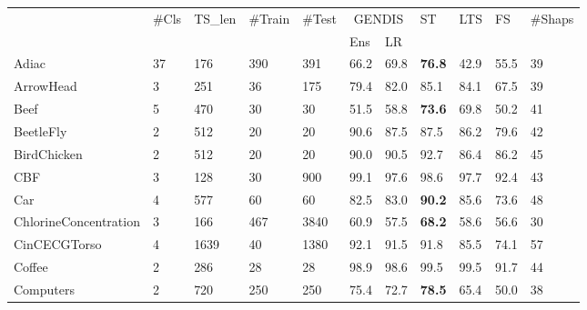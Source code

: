 \documentclass[runningheads]{llncs}
\begin{document}
\begin{table}[t]
	\centering
	\scriptsize
	\begin{tabular}{>{\tiny}lllll|lllll|l}
		\toprule
		\multirow{2}{*}{\scriptsize Dataset} & \multirow{2}{*}{\#Cls} & \multirow{2}{*}{TS\_len} & \multirow{2}{*}{\#Train} & \multirow{2}{*}{\#Test} & \multicolumn{2}{c}{GENDIS} & \multirow{2}{*}{ST} & \multirow{2}{*}{LTS} & \multirow{2}{*}{FS} & \multirow{2}{*}{\#Shaps} \\
		& & & & & Ens & LR & & & & \\ \midrule
		Adiac                        & 37        & 176       & 390     & 391    & 66.2  & 69.8  & \textbf{76.8} & 42.9          & 55.5 & 39          \\
		ArrowHead                    & 3         & 251       & 36      & 175    & 79.4  & 82.0  & 85.1          & 84.1          & 67.5 & 39          \\
		Beef                         & 5         & 470       & 30      & 30     & 51.5  & 58.8  & \textbf{73.6} & 69.8          & 50.2 & 41          \\
		BeetleFly                    & 2         & 512       & 20      & 20     & 90.6  & 87.5  & 87.5          & 86.2          & 79.6 & 42          \\
		BirdChicken                  & 2         & 512       & 20      & 20     & 90.0  & 90.5  & 92.7          & 86.4          & 86.2 & 45          \\
		CBF                          & 3         & 128       & 30      & 900    & 99.1  & 97.6  & 98.6          & 97.7          & 92.4 & 43          \\
		Car                          & 4         & 577       & 60      & 60     & 82.5  & 83.0  & \textbf{90.2} & 85.6          & 73.6 & 48          \\
		ChlorineConcentration        & 3         & 166       & 467     & 3840   & 60.9  & 57.5  & \textbf{68.2} & 58.6          & 56.6 & 30          \\
		CinCECGTorso                 & 4         & 1639      & 40      & 1380   & 92.1  & 91.5  & 91.8          & 85.5          & 74.1 & 57          \\
		Coffee                       & 2         & 286       & 28      & 28     & 98.9  & 98.6  & 99.5          & 99.5          & 91.7 & 44          \\
		Computers                    & 2         & 720       & 250     & 250    & 75.4  & 72.7  & \textbf{78.5} & 65.4          & 50.0 & 38          \\

\end{tabular}
\end{table}
\end{document}
